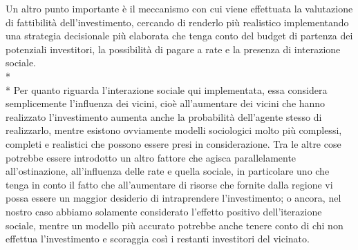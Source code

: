 \documentclass[12pt,a4paper,openright,twoside]{report}
\begin{document}
Un altro punto importante è il meccanismo con cui viene effettuata la valutazione di fattibilità dell'investimento, cercando di renderlo più realistico implementando una strategia decisionale più elaborata che tenga conto del budget di partenza dei potenziali investitori, la possibilità di pagare a rate e la presenza di interazione sociale.
\\* \\*
Per quanto riguarda l'interazione sociale qui implementata, essa considera semplicemente l’influenza dei vicini, cioè
all’aumentare dei vicini che hanno realizzato l’investimento aumenta anche la probabilità dell’agente stesso di realizzarlo, mentre esistono ovviamente modelli sociologici molto più complessi, completi e realistici che possono essere presi in considerazione. Tra le altre cose potrebbe essere introdotto un altro fattore che agisca parallelamente all'ostinazione, all'influenza delle rate e quella sociale, in particolare uno che tenga in conto il fatto che all’aumentare di risorse che fornite dalla regione vi possa essere un maggior desiderio di intraprendere l’investimento; o ancora, nel nostro caso abbiamo solamente considerato l'effetto positivo dell'iterazione sociale, mentre un modello più accurato potrebbe anche tenere conto di chi non effettua l'investimento e scoraggia così i restanti investitori del vicinato.




\nocite{*}


\end{document}
